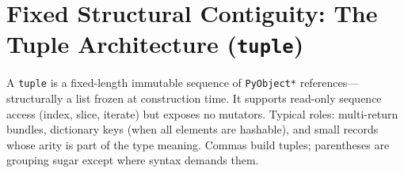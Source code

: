 \section{Fixed Structural Contiguity: The Tuple Architecture (\texttt{tuple})}

A \texttt{tuple} is a fixed-length immutable sequence of \texttt{PyObject*} references---structurally a list frozen at construction time. It supports read-only sequence access (index, slice, iterate) but exposes no mutators. Typical roles: multi-return bundles, dictionary keys (when all elements are hashable), and small records whose arity is part of the type meaning. Commas build tuples; parentheses are grouping sugar except where syntax demands them.
